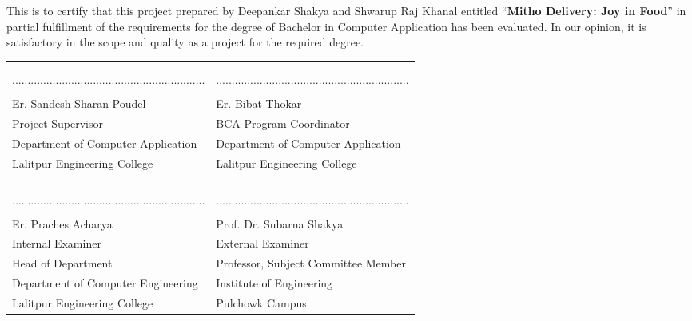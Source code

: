 This is to certify that this project prepared by Deepankar Shakya and Shwarup Raj Khanal entitled “\textbf{Mitho Delivery: Joy in Food}” in partial fulfillment of the requirements for the degree of Bachelor in Computer Application has been evaluated. In our opinion, it is satisfactory in the scope and quality as a project for the required degree.
\begin{center}
    {\fontsize{14pt}{18}\selectfont
    \begin{table}[ht]
        \begin{tabularx}{\textwidth}{|Y|Y|}
        \hline
        &\\
        &\\
        ..............................................................&..............................................................\\
        &\\
        Er. Sandesh Sharan Poudel & Er. Bibat Thokar \\
        Project Supervisor & BCA Program Coordinator \\
        Department of Computer Application & Department of Computer Application\\
        Lalitpur Engineering College & Lalitpur Engineering College \\
        &\\
        &\\
        \hline
        &\\
        &\\
        .............................................................. & ..............................................................\\
        &\\
        Er. Praches Acharya & Prof. Dr. Subarna Shakya\\
        Internal Examiner&External Examiner\\
        Head of Department & Professor, Subject Committee Member\\
        Department of Computer Engineering & Institute of Engineering \\
        Lalitpur Engineering College & Pulchowk Campus \\
        \hline
        \end{tabularx}
        \end{table}
    }
\end{center}